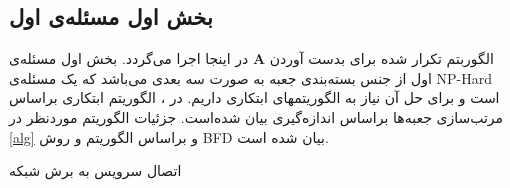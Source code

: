 \subsection{بخش اول مسئله‌ی اول}\label{firstsub}
الگوربتم تکرار شده برای بدست آوردن $\boldsymbol{A}$ در اینجا اجرا می‌گردد. بخش اول مسئله‌ی اول از جنس بسته‌بندی جعبه به صورت سه بعدی می‌باشد که یک مسئله‌ی NP-Hard است و برای حل آن نیاز به الگوریتمهای ابتکاری داریم.
در 
\cite{3dbin}،
الگوریتم ابتکاری براساس مرتب‌سازی جعبه‌ها براساس اندازه‌گیری بیان شده‌است. جزئیات الگوریتم موردنظر در \ref{alg}
و براساس الگوریتم
 \cite{3dbin}
 و روش
  BFD
  بیان شده است.

	\begin{algorithm}
		\caption{اتصال سرویس به برش شبکه}\label{alg}
		\begin{latin}
		\begin{algorithmic}[1]
			
			\Else
			\EndIf
			\EndFor
			\EndFor
		\end{algorithmic}
	\end{latin}
	\end{algorithm}


